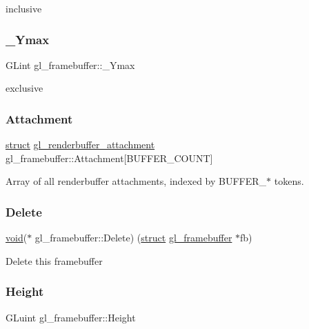 inclusive \mbox{\label{structgl__framebuffer_a852cee35ad38c0dd3036a754cfb80810}} 
\subsubsection{\texorpdfstring{\+\_\+\+Ymax}{\_Ymax}}
{\footnotesize\ttfamily G\+Lint gl\+\_\+framebuffer\+::\+\_\+\+Ymax}

exclusive \mbox{\label{structgl__framebuffer_a35ede5a6589db2944e338d025ec931bc}} 
\subsubsection{\texorpdfstring{Attachment}{Attachment}}
{\footnotesize\ttfamily \hyperlink{interfacestruct}{struct} \hyperlink{structgl__renderbuffer__attachment}{gl\+\_\+renderbuffer\+\_\+attachment} gl\+\_\+framebuffer\+::\+Attachment\mbox{[}B\+U\+F\+F\+E\+R\+\_\+\+C\+O\+U\+NT\mbox{]}}

Array of all renderbuffer attachments, indexed by B\+U\+F\+F\+E\+R\+\_\+$\ast$ tokens. \mbox{\label{structgl__framebuffer_a179b9f40b107c71d68a7d5eb47124cc8}} 
\subsubsection{\texorpdfstring{Delete}{Delete}}
{\footnotesize\ttfamily \hyperlink{interfacevoid}{void}($\ast$ gl\+\_\+framebuffer\+::\+Delete) (\hyperlink{interfacestruct}{struct} \hyperlink{structgl__framebuffer}{gl\+\_\+framebuffer} $\ast$fb)}

Delete this framebuffer \mbox{\label{structgl__framebuffer_ae5d2ed25f08fab458eeb6899119f94e5}} 
\subsubsection{\texorpdfstring{Height}{Height}}
{\footnotesize\ttfamily G\+Luint gl\+\_\+framebuffer\+::\+Height}

